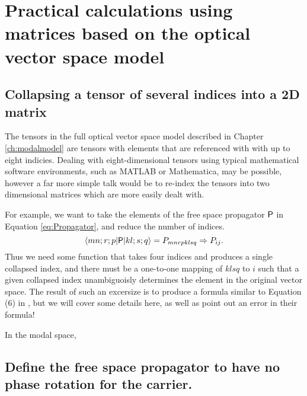 \chapter{Practical calculations using matrices based on the optical vector space model}

\section{Collapsing a tensor of several indices into a 2D matrix}
The tensors in the full optical vector space model described in Chapter \ref{ch:modalmodel} are tensors with elements that are referenced with with up to eight indicies. %
Dealing with eight-dimensional tensors using typical mathematical software environments, such as \mbox{MATLAB} or Mathematica, may be possible, however a far more simple talk would be to re-index the tensors into two dimensional matrices which are more easily dealt with.

For example, we want to take the elements of the free space propagator $\mathsf{P}$ in Equation \ref{eq:Propagator}, and reduce the number of indices.
\begin{equation}
\matrixel{mn;r;p}{\oper{P}}{kl;s;q} = P_{mnrpklsq} \Rightarrow P_{ij}.
\end{equation}
Thus we need some function that takes four indices and produces a single collapsed index, and there must be a one-to-one mapping of $klsq$ to $i$ such that a given collapsed index unambiguoisly determines the element in the original vector space. %
The result of such an excersize is to produce a formula similar to Equation (6) in \citet{Sigg:00}, but we will cover some details here, as well as point out an error in their formula!

In the modal space,






\section{Define the free space propagator to have no phase rotation for the  carrier.}

